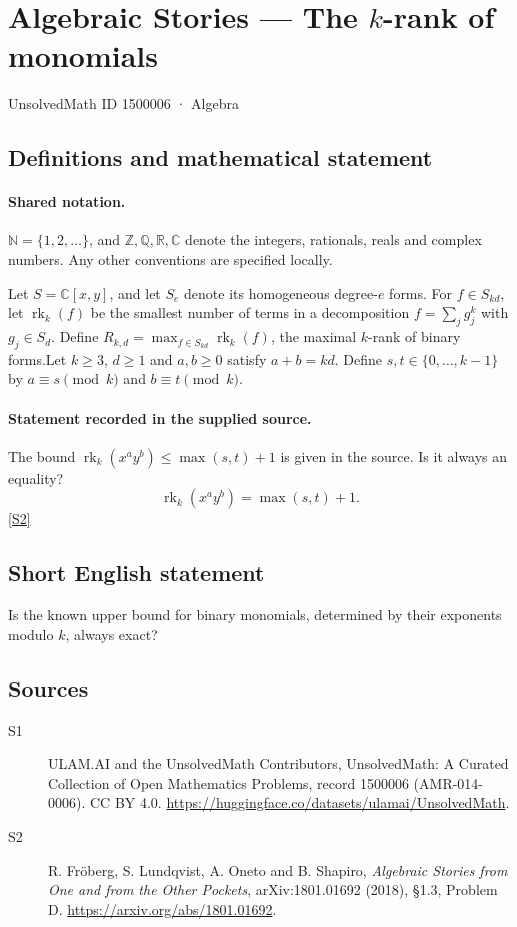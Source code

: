 \documentclass[11pt]{article}
\newcommand{\sref}[2]{\hyperlink{source:#1:#2}{[S#2]}}
\begin{document}
\setcounter{section}{1500005}
\section{Algebraic Stories — The $k$-rank of monomials}\label{1500006}
{\small\sffamily UnsolvedMath ID 1500006 · Algebra}
\subsection{Definitions and mathematical statement}

\paragraph{Shared notation.}$\mathbb N=\{1,2,\ldots\}$, and $\mathbb Z,\mathbb Q,\mathbb R,\mathbb C$ denote the integers, rationals, reals and complex numbers. Any other conventions are specified locally.


Let $S=\mathbb C[x,y]$, and let $S_e$ denote its homogeneous degree-$e$ forms. For $f\in S_{kd}$, let $\operatorname{rk}_k(f)$ be the smallest number of terms in a decomposition $f=\sum_jg_j^k$ with $g_j\in S_d$. Define $R_{k,d}=\max_{f\in S_{kd}}\operatorname{rk}_k(f)$, the maximal $k$-rank of binary forms.Let $k\geq3$, $d\geq1$ and $a,b\geq0$ satisfy $a+b=kd$. Define $s,t\in\{0,\ldots,k-1\}$ by $a\equiv s\pmod k$ and $b\equiv t\pmod k$.
\paragraph{Statement recorded in the supplied source.}
The bound $\operatorname{rk}_k(x^ay^b)\leq\max(s,t)+1$ is given in the source. Is it always an equality?
\[\operatorname{rk}_k(x^ay^b)=\max(s,t)+1.\] \sref{1500006}{2}
\subsection{Short English statement}
Is the known upper bound for binary monomials, determined by their exponents modulo $k$, always exact?
\subsection{Sources}
\begin{description}
\item[\hypertarget{source:1500006:1}{S1}] ULAM.AI and the UnsolvedMath Contributors, UnsolvedMath: A Curated Collection of Open Mathematics Problems, record 1500006 (AMR-014-0006). CC BY 4.0. \url{https://huggingface.co/datasets/ulamai/UnsolvedMath}.
\item[\hypertarget{source:1500006:2}{S2}] R. Fröberg, S. Lundqvist, A. Oneto and B. Shapiro, \emph{Algebraic Stories from One and from the Other Pockets}, arXiv:1801.01692 (2018), §1.3, Problem D. \url{https://arxiv.org/abs/1801.01692}.
\end{description}
\label{end:1500006}
\end{document}

